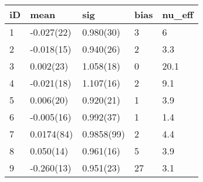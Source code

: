 
\begin{tabular}{l|l|l|l|l}
\hline
iD & mean & sig & bias & nu\_eff\\
\hline
1 & -0.027(22) & 0.980(30) & 3 & 6\\
\hline
2 & -0.018(15) & 0.940(26) & 2 & 3.3\\
\hline
3 & 0.002(23) & 1.058(18) & 0 & 20.1\\
\hline
4 & -0.021(18) & 1.107(16) & 2 & 9.1\\
\hline
5 & 0.006(20) & 0.920(21) & 1 & 3.9\\
\hline
6 & -0.005(16) & 0.992(37) & 1 & 1.4\\
\hline
7 & 0.0174(84) & 0.9858(99) & 2 & 4.4\\
\hline
8 & 0.050(14) & 0.961(16) & 5 & 3.9\\
\hline
9 & -0.260(13) & 0.951(23) & 27 & 3.1\\
\hline
\end{tabular}
